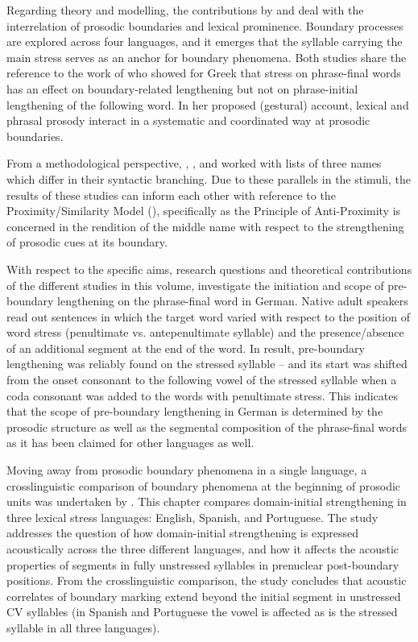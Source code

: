 \begin{refsection}
Regarding theory and modelling, the contributions by  and  deal with the interrelation of prosodic boundaries and lexical prominence. Boundary processes are explored across four languages, and it emerges that the syllable carrying the main stress serves as an anchor for boundary phenomena. Both studies share the reference to the work of \citet{Katsika2016} who showed for Greek that stress on phrase-final words has an effect on boundary-related lengthening but not on phrase-initial lengthening of the following word. In her proposed (gestural) account, lexical and phrasal prosody interact in a systematic and coordinated way at prosodic boundaries.


From a methodological perspective, , , and  worked with lists of three names which differ in their syntactic branching. Due to these parallels in the stimuli, the results of these studies can inform each other with reference to the Proximity/Similarity Model (\cite{KentnerFery2013}), specifically as the Principle of Anti-Proximity is concerned in the rendition of the middle name with respect to the strengthening of prosodic cues at its boundary. 

With respect to the specific aims, research questions and theoretical contributions of the different studies in this volume,   investigate the initiation and scope of pre-boundary lengthening on the phrase-final word in German. Native adult speakers read out sentences in which the target word varied with respect to the position of word stress (penultimate vs. antepenultimate syllable) and the presence/absence of an additional segment at the end of the word. In result, pre-boundary lengthening was reliably found on the stressed syllable – and its start was shifted from the onset consonant to the following vowel of the stressed syllable when a coda consonant was added to the words with penultimate stress. This indicates that the scope of pre-boundary lengthening in German is determined by the prosodic structure as well as the segmental composition of the phrase-final words as it has been claimed for other languages as well.

Moving away from prosodic boundary phenomena in a single language, a crosslinguistic comparison of boundary phenomena at the beginning of prosodic units was undertaken by . This chapter compares domain-initial strengthening in three lexical stress languages: English, Spanish, and Portuguese. The study addresses the question of how domain-initial strengthening is expressed acoustically across the three different languages, and how it affects the acoustic properties of segments in fully unstressed syllables in prenuclear post-boundary positions. From the crosslinguistic comparison, the study concludes that acoustic correlates of boundary marking extend beyond the initial segment in unstressed CV syllables (in Spanish and Portuguese the vowel is affected as is the stressed syllable in all three languages). 


\end{refsection}
